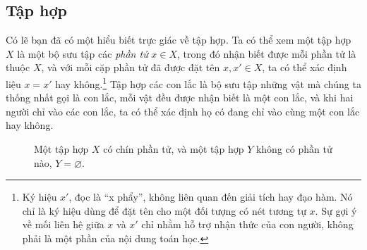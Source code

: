 \subsection{Tập hợp}
Có lẽ bạn đã có một hiểu biết trực giác về tập hợp. Ta có thể xem một tập hợp $X$ là một bộ sưu tập các \emph{phần tử} $x\in X$, trong đó nhận biết được mỗi phần tử là thuộc $X$, và với mỗi cặp phần tử đã được đặt tên $x,x'\in X$, ta có thể xác định liệu $x=x'$ hay không.\footnote{Ký hiệu $x'$, đọc là ``x phẩy'', không liên quan đến giải tích hay đạo hàm. Nó chỉ là ký hiệu dùng để đặt tên cho một đối tượng có nét tương tự $x$. Sự gợi ý về mối liên hệ giữa $x$ và $x'$ chỉ nhằm hỗ trợ nhận thức của con người, không phải là một phần của nội dung toán học.} Tập hợp các con lắc là bộ sưu tập những vật mà chúng ta thống nhất gọi là con lắc, mỗi vật đều
được nhận biết là một con lắc, và khi hai người chỉ vào các con lắc, ta có thể xác định họ có đang chỉ vào cùng một con lắc hay không.
\begin{figure}[htbp]\centering
{}
\caption{Một tập hợp $X$ có chín phần tử, và một tập hợp $Y$ không có phần tử nào, $Y=\varnothing$.}\label{fig:2-1}
\end{figure}
